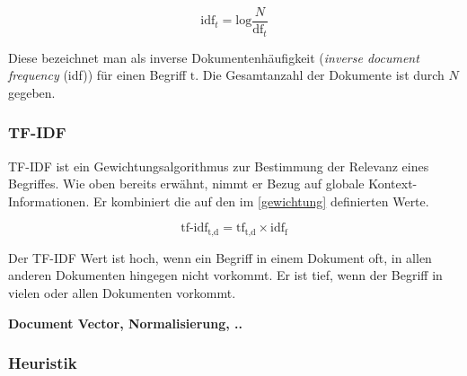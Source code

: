 \[
\text{idf}_{t}=\text{log}\frac{N}{\text{df}_{t}}
\]

Diese bezeichnet man als inverse Dokumentenhäufigkeit (\textit{inverse document frequency} (idf)) für einen Begriff $\text{t}$. Die Gesamtanzahl der Dokumente ist durch $N$ gegeben.
\\\cite{manning2008introduction}



\subsubsection{TF-IDF}


TF-IDF ist ein Gewichtungsalgorithmus zur Bestimmung der Relevanz eines Begriffes. Wie oben bereits erwähnt, nimmt er Bezug auf globale Kontext-Informationen. Er kombiniert die auf den im \autoref{gewichtung} definierten Werte.

\[
    \text{tf-idf}_{\text{t,d}} = \text{tf}_{\text{t,d}}\times\text{idf}_\text{f}
\]

Der TF-IDF Wert ist hoch, wenn ein Begriff in einem Dokument oft, in allen anderen Dokumenten hingegen nicht vorkommt. Er ist tief, wenn der Begriff in vielen oder allen Dokumenten vorkommt.


\textbf{Document Vector, Normalisierung, ..}

\cite{manning2008introduction}






\subsubsection{Heuristik}


